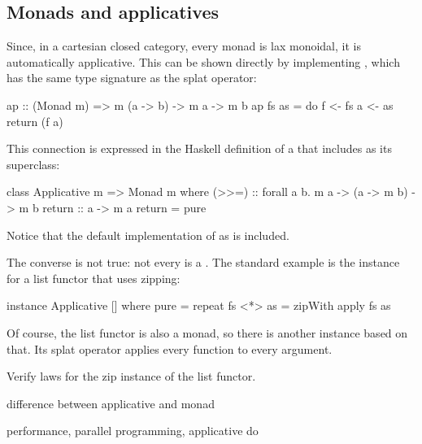 \documentclass[DaoFP]{subfiles}
\begin{document}
\subsection{Monads and applicatives}

Since, in a cartesian closed category, every monad is lax monoidal, it is automatically applicative. This can be shown directly by implementing , which has the same type signature as the splat operator:
\begin{haskell}
ap :: (Monad m) => m (a -> b) -> m a -> m b
ap fs as = do 
    f <- fs
    a <- as
    return (f a) 
\end{haskell}

This connection is expressed in the Haskell definition of a  that includes  as its superclass:
\begin{haskell}
class Applicative m => Monad m where
    (>>=)       :: forall a b. m a -> (a -> m b) -> m b
    return      :: a -> m a
    return      = pure
\end{haskell}
Notice that the default implementation of  as  is included. 

The converse is not true: not every  is a . The standard example is the  instance for a list functor that uses zipping:
\begin{haskell}
instance Applicative [] where
  pure = repeat
  fs <*> as = zipWith apply fs as
\end{haskell}
Of course, the list functor is also a monad, so there is another  instance based on that. Its splat operator applies every function to every argument.



\begin{exercise}
Verify  laws for the zip instance of the list functor.
\end{exercise}

difference between applicative and monad

performance, parallel programming, applicative do
\end{document}
